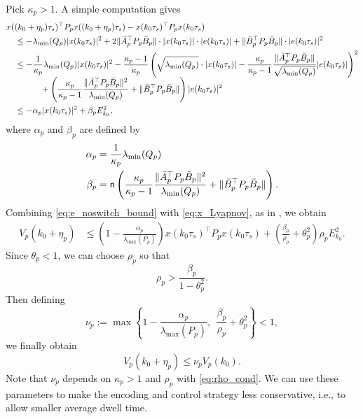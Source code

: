 \documentclass[letterpaper, 11pt, onecolumn]{ieeeconf}  \IEEEoverridecommandlockouts
\begin{document}
Pick $\kappa_p > 1$.
A simple computation gives
\begin{align}
&x((k_0+\eta_p)\tau_s)^{\top}P_px((k_0+\eta_p)\tau_s) - 
x(k_0\tau_s)^{\top}P_px(k_0\tau_s) \notag \\
&\quad \leq
- \lambda_{\min}(Q_p) |x(k_0\tau_s) |^2 
+2 \|\bar A_p^{\top} P_p \bar B_p\|\cdot  |x(k_0\tau_s) | \cdot |e(k_0\tau_s) |
+\| \bar B_p^{\top}P_p \bar B_p \| \cdot | e(k_0\tau_s)|^2 \notag \\
&\quad \leq
-\frac{1}{\kappa_p} \lambda_{\min}(Q_p) |x(k_0\tau_s) |^2 
- \frac{\kappa_p -1}{\kappa_p } \left(
\sqrt{\lambda_{\min}(Q_p)} \cdot |x(k_0\tau_s)|
-\frac{\kappa_p}{\kappa_p -1}
\frac{\|\bar A_p^{\top} P_p \bar B_p\|}{\sqrt{\lambda_{\min}(Q_p)}} | e(k_0\tau_s)|
\right)^2 \notag \\[-5pt]
&\qquad \qquad
+ 
\left( \frac{\kappa_p}{\kappa_p -1}
\frac{\|\bar A_p^{\top} P_p \bar B_p\|^2}{\lambda_{\min}(Q_p)} +
\| \bar B_p^{\top}P_p \bar B_p \|
\right)  | e(k_0\tau_s)|^2 \notag \\
&\quad \leq
-\alpha_p |x(k_0\tau_s) |^2 
 +\beta_p E_{k_0}^2,
\label{eq:x_Lyapnov}
\end{align}
where $\alpha_p$ and $\beta_p$ are defined by
\begin{align*}
\alpha_p &= \frac{1}{\kappa_p} \lambda_{\min}(Q_p) \\
\beta_p &= {\sf n}
\left( \frac{\kappa_p}{\kappa_p -1}
\frac{\|\bar A_p^{\top} P_p \bar B_p\|^2}{\lambda_{\min}(Q_p)} +
\| \bar B_p^{\top}P_p \bar B_p \|
\right).
\end{align*}
Combining \eqref{eq:e_noswitch_bound} with \eqref{eq:x_Lyapnov},
as in \cite[Lemma 1]{Liberzon2014}, we obtain
\begin{align*}
V_p(k_0+\eta_p)
&\leq
\left(
1 - \frac{\alpha_p}{\lambda_{\max}(P_p)}
\right) x(k_0\tau_s)^{\top}P_p x(k_0\tau_s) 
+ \left(\frac{\beta_p}{\rho_p} + \theta_p^2 \right) \rho_p E_{k_0}^2.
\end{align*}
Since $\theta_p<1$,
we can choose $\rho_p$ so that
\begin{equation}
\label{eq:rho_cond}
\rho_p > \frac{\beta_p}{1 - \theta_p^2}.
\end{equation}
Then defining
\begin{equation}
\label{eq:nu_p_def}
\nu_p := 
\max
\left\{
1 - \frac{\alpha_p}{\lambda_{\max}(P_p)},~~
\frac{\beta_p}{\rho_p} + \theta_p^2
\right\} < 1,
\end{equation}
we finally obtain
\begin{equation}
\label{eq:Lyapunov_nonswitched}
V_p(k_0+\eta_p) \leq \nu_p V_p(k_0).
\end{equation}
Note that $\nu_p$ depends on $\kappa_p > 1$ and $\rho_p$ with \eqref{eq:rho_cond}.
We can use these parameters to make
the encoding and control strategy less conservative, i.e., to allow 
smaller average dwell time.
\end{document}
